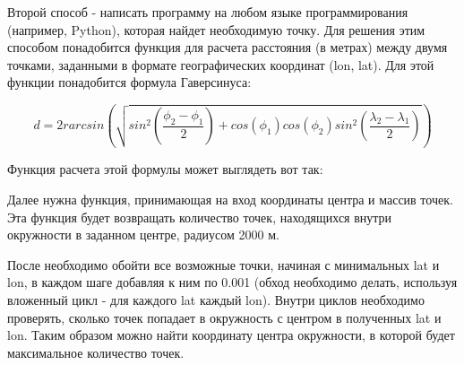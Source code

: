 
Второй способ - написать программу на любом языке программирования (например, Python), которая найдет необходимую точку. Для решения этим способом понадобится функция для расчета расстояния (в метрах) между двумя точками, заданными в формате географических координат (lon, lat). Для этой функции понадобится формула Гаверсинуса:

$$d = 2 r arcsin \left( \sqrt{sin^2\left(\frac{\phi_2 - \phi_1}{2}\right) + cos(\phi_1)cos(\phi_2)sin^2\left(\frac{\lambda_2 - \lambda_1}{2}\right)}\right)$$

Функция расчета этой формулы может выглядеть вот так:


Далее нужна функция, принимающая на вход координаты центра и массив точек. Эта функция будет возвращать количество точек, находящихся внутри окружности в заданном центре, радиусом 2000 м.

После необходимо обойти все возможные точки, начиная с минимальных lat и lon, в каждом шаге добавляя к ним по 0.001 (обход необходимо делать, используя вложенный цикл - для каждого lat каждый lon). Внутри циклов необходимо проверять, сколько точек попадает в окружность с центром в полученных lat и lon. Таким образом можно найти координату центра окружности, в которой будет максимальное количество точек.

